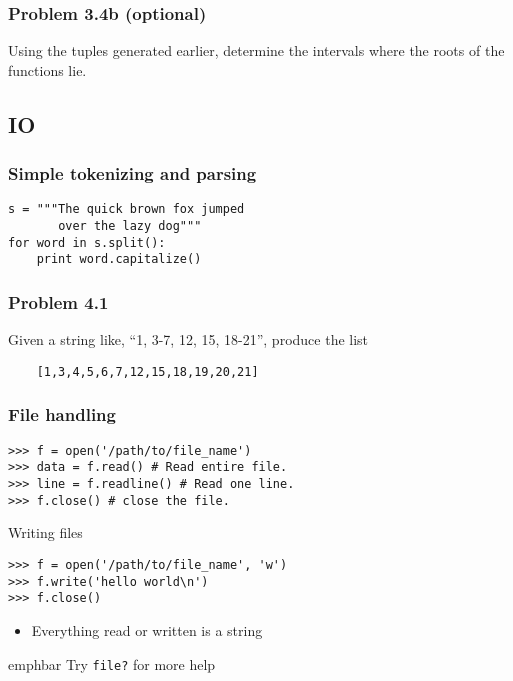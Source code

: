 \documentclass[14pt,compress]{beamer}
\newcommand{\emphbar}[1]
{\begin{beamercolorbox}[rounded=true]{emphbar} 
      {#1}
 \end{beamercolorbox}
}
\newcounter{time}
\newcommand{\inctime}[1]{\addtocounter{time}{#1}{\tiny \thetime\ m}}
\newcommand{\typ}[1]{\texttt{#1}}
\begin{document}
\begin{frame}[fragile]
  \frametitle{Problem 3.4b (optional)}

  Using the tuples generated earlier, determine the intervals where the roots of the functions lie.

  \inctime{15}
\end{frame}


\subsection{IO}

\begin{frame}[fragile]
  \frametitle{Simple tokenizing and parsing}
  \begin{lstlisting}
s = """The quick brown fox jumped
       over the lazy dog"""
for word in s.split():
    print word.capitalize()
  \end{lstlisting}
\end{frame}

\begin{frame}[fragile]
  \frametitle{Problem 4.1}
  Given a string like, ``1, 3-7, 12, 15, 18-21'', produce the list \\
  \begin{lstlisting}
    [1,3,4,5,6,7,12,15,18,19,20,21]
  \end{lstlisting}
\end{frame}

\begin{frame}[fragile]
  \frametitle{File handling}
\begin{lstlisting}
>>> f = open('/path/to/file_name')
>>> data = f.read() # Read entire file.
>>> line = f.readline() # Read one line.
>>> f.close() # close the file.
\end{lstlisting}
Writing files
\begin{lstlisting}
>>> f = open('/path/to/file_name', 'w')
>>> f.write('hello world\n')
>>> f.close()
\end{lstlisting}
\begin{itemize}
    \item Everything read or written is a string
\end{itemize}
\emphbar{Try \typ{file?} for more help}
\end{frame}
\end{document}

